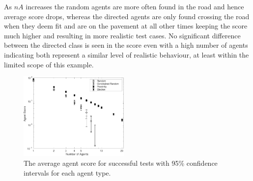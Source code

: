 \documentclass[letterpaper, 10 pt, journal, twoside]{IEEEtran}
\begin{document}

As $nA$ increases the random agents are more often found in the road and hence average score drops, whereas the directed agents are only found crossing the road when they deem fit and are on the pavement at all other times keeping the score much higher and resulting in more realistic test cases.
%
%
%
No significant difference between the directed class is seen in the score even with a high number of agents indicating both represent a similar level of realistic behaviour, at least within the limited scope of this example.


\begin{figure}[!t]
	\centering
\includegraphics[width=0.48\textwidth]{AgentScore.pdf}
	\caption{The average agent score for successful tests with 95\% confidence intervals for each agent type.}%
	\label{AgentScore}
\end{figure}


\end{document}

